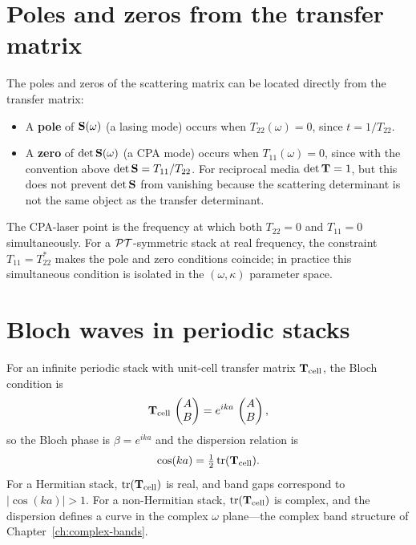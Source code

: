 \section{Poles and zeros from the transfer matrix}
\label{sec:poles-zeros-transfer}

The poles and zeros of the scattering matrix can be located directly
from the transfer matrix:
\begin{itemize}
 \item A \textbf{pole} of $\mathbf{S}(\omega)$ (a lasing mode) occurs when
 $T_{22}(\omega) = 0$, since $t = 1/T_{22}$.
 \item A \textbf{zero} of $\det\mathbf{S}(\omega)$ (a CPA mode) occurs when
 $T_{11}(\omega)=0$, since with the convention above
 $\det\mathbf{S}=T_{11}/T_{22}$. For reciprocal media $\det\mathbf{T}=1$, but
 this does not prevent $\det\mathbf{S}$ from vanishing because the scattering
 determinant is not the same object as the transfer determinant.
\end{itemize}

The CPA-laser point is the frequency at which both $T_{22} = 0$ and
$T_{11} = 0$ simultaneously. For a $\mathcal{PT}$-symmetric stack at real
frequency, the constraint $T_{11}=T_{22}^*$ makes the pole and zero
conditions coincide; in practice this simultaneous condition is isolated
in the $(\omega,\kappa)$ parameter space.


\section{Bloch waves in periodic stacks}
\label{sec:bloch-transfer}

For an infinite periodic stack with unit-cell transfer matrix
$\mathbf{T}_{\mathrm{cell}}$, the Bloch condition is
\begin{equation}
 \mathbf{T}_{\mathrm{cell}}\,
 \begin{pmatrix} A \\ B \end{pmatrix}
 = e^{ika}\,
 \begin{pmatrix} A \\ B \end{pmatrix},
 \label{eq:bloch-transfer}
\end{equation}
so the Bloch phase is $\beta = e^{ik a}$ and the dispersion relation is
\begin{equation}
 \cos(ka) = \tfrac{1}{2}\,\mathrm{tr}(\mathbf{T}_{\mathrm{cell}}).
 \label{eq:dispersion-transfer}
\end{equation}
For a Hermitian stack, $\mathrm{tr}(\mathbf{T}_{\mathrm{cell}})$ is real,
and band gaps correspond to $|\cos(ka)| > 1$. For a non-Hermitian
stack, $\mathrm{tr}(\mathbf{T}_{\mathrm{cell}})$ is complex, and the
dispersion defines a curve in the complex $\omega$ plane---the complex
band structure of Chapter~\ref{ch:complex-bands}.

